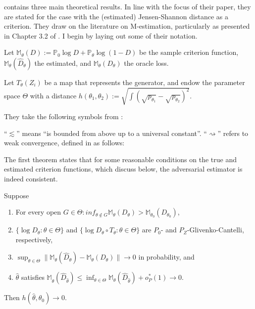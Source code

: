 \textcite{kaji2023adversarial} contains three main theoretical results.
In line with the focus of their paper, they are stated for the case with the (estimated) Jensen-Shannon distance as a criterion.
They draw on the literature on M-estimation, particularly as presented in Chapter 3.2 of \textcite{vanderVaart2023}. %
I begin by laying out some of their notation.

Let $\mathbb{M}_{\theta}(D):=\mathbb{P}_{0} \log D+\mathbb{P}_{\theta} \log (1-D)$ be the sample criterion function, 
$\mathbb{M}_{\theta}\left(\hat{D}_{\theta}\right)$ the estimated, and 
$\mathbb{M}_{\theta}\left(D_{\theta}\right)$ the oracle loss.

Let $T_{\theta}(Z_i)$ be a map that represents the generator,
and endow the parameter space $\Theta$ with a distance $h\left(\theta_{1}, \theta_{2}\right):=\sqrt{\int\left(\sqrt{p_{\theta_{1}}}-\sqrt{p_{\theta_{2}}}\right)^{2}}$.

They take the following symbols from \textcite{vanderVaart2023}:

``$\lesssim$'' means ``is bounded from above up to a universal constant''.
``$\rightsquigarrow$'' refers to weak convergence, defined in \textcite{vanderVaart2023} as follows:


The first theorem states that for some reasonable conditions on the true and estimated criterion functions, which discuss below, the adversarial estimator is indeed consistent.

\begin{theorem}
    \label{th:kmp_1}
    Suppose
    \begin{enumerate}
        \item For every open $G \in \Theta : inf_{\theta \notin G} \mathbb{M}_{\theta}(D_{\theta}) > \mathbb{M}_{\theta_0}(D_{\theta_0})$,
        \item $\{ \log D_{\theta} : \theta \in \Theta \}$ and $\{ \log D_{\theta} \circ T_{\theta}: \theta \in \Theta \}$ are $P_0$- and $P_Z$-Glivenko-Cantelli, respectively,
        \item $\sup_{\theta \in \Theta} \| \mathbb{M}_{\theta}(\hat{D}_{\theta}) - \mathbb{M}_{\theta}(D_{\theta}) \| \rightarrow 0$ in probability, and
        \item $\hat{\theta}$ satisfies $\mathbb{M}_{\hat{\theta}}(\hat{D}_{\hat{\theta}}) \leq \inf_{\theta \in \Theta} \mathbb{M}_{\theta}(\hat{D}_{\hat{\theta}}) + o_P^{*}(1) \rightarrow 0$.
    \end{enumerate}
    Then $h(\hat{\theta}, \theta_0) \rightarrow 0$.
\end{theorem}

